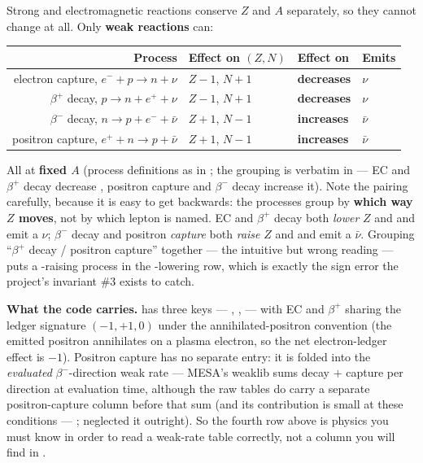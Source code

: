 Strong and electromagnetic reactions conserve $Z$ and $A$ separately, so they
cannot change \Ye{} at all. Only \textbf{weak reactions} can:

\begin{center}
\small
\begin{tabularx}{\textwidth}{@{}R{1.000} l l l@{}}
\toprule
\textbf{Process} & \textbf{Effect on $(Z, N)$} & \textbf{Effect on \Ye{}} &
\textbf{Emits} \\
\midrule
electron capture, $e^- + p \to n + \nu$   & $Z-1$, $N+1$ &
  \textbf{decreases} & $\nu$ \\
$\beta^+$ decay, $p \to n + e^+ + \nu$    & $Z-1$, $N+1$ &
  \textbf{decreases} & $\nu$ \\
$\beta^-$ decay, $n \to p + e^- + \bar\nu$ & $Z+1$, $N-1$ &
  \textbf{increases} & $\bar\nu$ \\
positron capture, $e^+ + n \to p + \bar\nu$ & $Z+1$, $N-1$ &
  \textbf{increases} & $\bar\nu$ \\
\bottomrule
\end{tabularx}
\end{center}

All at \textbf{fixed $A$} (process definitions as in
\citealt{langanke2000,langanke2003}; the grouping is verbatim in
\citealt{heger2001} --- EC and $\beta^+$ decay decrease \Ye{}, positron capture
and $\beta^-$ decay increase it). Note the pairing carefully, because it is easy
to get backwards: the processes group by \textbf{which way $Z$ moves}, not by
which lepton is named. EC and $\beta^+$ decay both \emph{lower} $Z$ and \Ye{}
and emit a $\nu$; $\beta^-$ decay and positron \emph{capture} both \emph{raise}
$Z$ and \Ye{} and emit a $\bar\nu$. Grouping ``$\beta^+$ decay / positron
capture'' together --- the intuitive but wrong reading --- puts a \Ye{}-raising
process in the \Ye{}-lowering row, which is exactly the sign error the
project's invariant \#3 exists to catch.

\textbf{What the code carries.}  has three
keys --- , ,  --- with
EC and $\beta^+$ sharing the ledger signature $(-1, +1, 0)$ under the
annihilated-positron convention (the emitted positron annihilates on a plasma
electron, so the net electron-ledger effect is $-1$). Positron capture has no
separate entry: it is folded into the \emph{evaluated} $\beta^-$-direction weak
rate --- MESA's weaklib sums decay $+$ capture per direction at evaluation time,
although the raw tables do carry a separate positron-capture column before that
sum (and its contribution is small at these conditions ---
\citealt{langanke2000}; \citealt{heger2001} neglected it outright). So the
fourth row above is physics you must know in order to read a weak-rate table
correctly, not a column you will find in .

